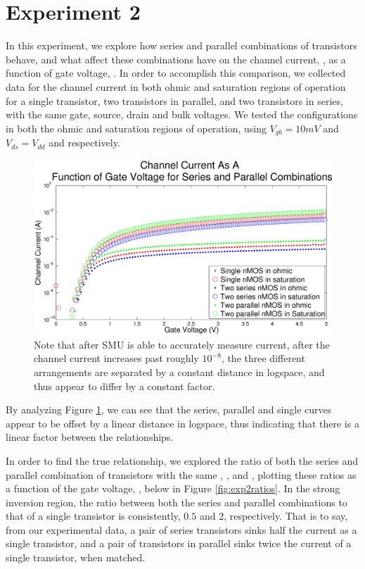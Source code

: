 \section*{Experiment 2}
In this experiment, we explore how series and parallel combinations of \nMOS transistors behave, 
and what affect these combinations have on the channel current, \Isat, as a function of gate voltage,
\Vg. In order to accomplish this comparison, we collected data for the channel current in both ohmic 
and saturation regions of operation for a single \nMOS transistor, two transistors in parallel, and
two transistors in series, with the same gate, source, drain and bulk voltages. We tested the 
configurations in both the ohmic and saturation regions of operation, using $V_{gb} = 10mV$ and
 $ V_{ds} = V_{dd}$ and respectively.

\begin{figure}[H]
\centering
\includegraphics[width=\linewidth]{../Figures/Experiment2Currents.eps}
\caption{Note that after SMU is able to accurately measure current, after the channel current increases past roughly $10^{-8}$, the three different arrangements are separated by a constant distance in logspace, and thus appear to differ by a constant factor.}
\label{fig:exp2currents}
\end{figure}

By analyzing Figure \ref{fig:exp2currents}, we can see that the series, parallel and single curves appear to be offset by a linear distance in logspace, thus indicating that there is a linear factor between the relationships. 

In order to find the true relationship, we explored the ratio of both the series and parallel combination of \nMOS transistors with the same \Vg, \Vd, \Vs and \Vb, plotting these ratios as a function of the gate voltage, \Vg, below in Figure \ref{fig:exp2ratios}. 
In the strong inversion region, the ratio between both the series and parallel combinations to that of a single transistor is consistently, $0.5$ and $2$, respectively. That is to say, from our experimental data, a pair of series transistors sinks half the current as a single transistor, and a pair of transistors in parallel sinks twice the current of a single transistor, when matched.

